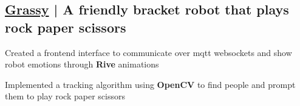 \vspace{0.3cm}\subsection{\href{https://github.com/arian81/bracket-bot-controller}{Grassy} | A friendly bracket robot that plays rock paper scissors }
\begin{zitemize}
    \item Created a frontend interface to communicate over mqtt websockets and show robot emotions through \textbf{Rive} animations
    \item Implemented a tracking algorithm using \textbf{OpenCV} to find people and prompt them to play rock paper scissors
\end{zitemize}



